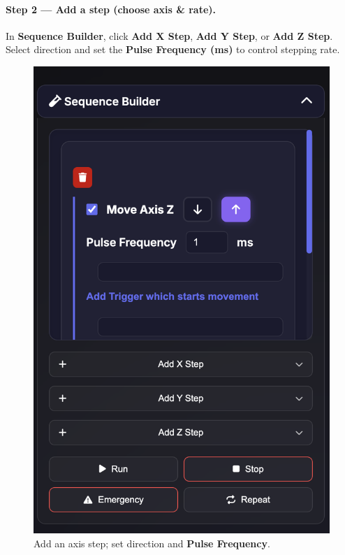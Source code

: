 \documentclass[
    twocolumn,
    fontsize = 10pt,
    parskip = half+,
    headings = small,
    headwidth = text,
    footwidth = text,
]{scrartcl}
\begin{document}
\paragraph{\textbf{Step 2 — Add a step (choose axis \& rate).}}
In \textbf{Sequence Builder}, click \textbf{Add X Step}, \textbf{Add Y Step}, or \textbf{Add Z Step}. Select direction and set the \textbf{Pulse Frequency (ms)} to control stepping rate.
\begin{figure}[htbp]\centering
  \includegraphics[width=.9\linewidth]{pics/sb-1.png}
  \caption{Add an axis step; set direction and \textbf{Pulse Frequency}.}
  \label{fig:sb-1}
\end{figure}
\end{document}
